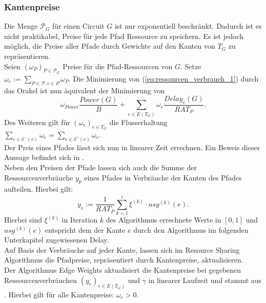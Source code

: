 \documentclass[11pt, a4paper, german]{article}
\begin{document}
\subsubsection{Kantenpreise}\label{subsubsec:kantenpreise}
Die Menge $\mathcal{P}_G$ für einen Circuit $G$ ist nur exponentiell beschränkt. Dadurch ist es nicht praktikabel, Preise für jede Pfad Ressource zu speichern. Es ist jedoch möglich, die Preise aller Pfade durch Gewichte auf den Kanten von $T_G$ zu repräsentieren. \\
Seien $(\omega _P)_{P \in \mathcal{P}_G}$ Preise für die Pfad-Ressourcen von $G$. Setze $\omega _e := \sum\limits_{P \in \mathcal{P} : e \in P} \omega _P$.  Die Minimierung von (\ref{eq:ressourcen_verbrauch_1}) durch das Orakel ist nun äquivalent der Minimierung von 
\begin{equation}\label{eq:ressourcen_verbrauch_2}
\omega _{Power} \frac{Power(G)}{B} + \sum\limits_{e \in E(T_G)} \omega_e \frac{Delay_e(G)}{RAT_P}.
\end{equation}
Des Weiteren gilt für $(\omega_e)_{e \in T_G}$ die Flusserhaltung $\sum_{e \in  \delta^- (v)} \omega_e = \sum_{e \in  \delta^+ (v)} \omega_e $.\\

Der Preis eines Pfades lässt sich nun in linearer Zeit errechnen. Ein Beweis dieser Aussage befindet sich in \cite{Haehnle2015}.\\
Neben den Preisen der Pfade lassen sich auch die Summe der Ressourcenverbräuche $y_p$ eines Pfades in Verbräuche der Kanten des Pfades aufteilen. Hierbei gilt: 
\[y_e := \frac{1}{RAT_P} \sum\limits_{k=1}^i \xi^{(k)} \cdot usg^{(k)}(e).\]
Hierbei sind $\xi^{(k)}$ in Iteration $k$ des Algorithmus errechnete Werte in $[0,1]$ und $usg^{(k)}(e)$ entspricht dem der Kante $e$ durch den Algorithmus im folgenden Unterkapitel zugewiesenen Delay.\\
Auf Basis der Verbräuche auf jeder Kante, lassen sich im Resource Sharing Algorithmus die Pfadpreise, repräsentiert durch Kantenpreise,  aktualisieren. \\

Der Algorithmus Edge Weights aktualisiert die Kantenpreise bei gegebenen Ressourcenverbräuchen $(y_e)_{e\in E(T_G)}$ und $\gamma$ in linearer Laufzeit und stammt aus \cite{Daboul2018}. Hierbei gilt für alle Kantenpreise: $\omega_e > 0$. 
\end{document}
